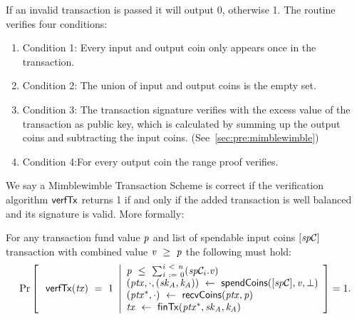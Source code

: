 \begin{definition}
\begin{itemize}
        If an invalid transaction is passed it will output 0, otherwise 1.
        The routine verifies four conditions:
        \begin{enumerate}
            \item Condition 1: Every input and output coin only appears once in the transaction.
            \item Condition 2: The union of input and output coins is the empty set.
            \item Condition 3: The transaction signature verifies with the excess value of the transaction as public key, which is calculated by summing up the output coins and subtracting the input coins. (See~\ref{sec:pre:mimblewimble})
            \item Condition 4:For every output coin the range proof verifies.
        \end{enumerate}
    \end{itemize}
\end{definition}

We say a Mimblewimble Transaction Scheme is correct if the verification algorithm $\mathsf{verfTx}$ returns 1 if and only if the added transaction is well balanced and its signature is valid.
More formally:
\begin{definition}
    \label{def:atom:tx-scheme-correctness}
    For any transaction fund value $\mathit{p}$ and list of spendable input coins $[\mathit{sp}\mathcal{C}]$ transaction with combined value $\mathit{v} ~\geq~ \mathit{p}$ the following must hold:
    \[
        \Pr\left[
        \begin{array}{c}
            \: \mathsf{verfTx}(\mathit{tx}) ~=~ 1
        \end{array}
        \middle\vert
        \begin{array}{l}
            \mathit{p} ~\leq~ \sum_{\mathit{i} ~:=~ 0}^{\mathit{i} ~<~ \mathit{n}}(\mathit{sp}\mathcal{C}_{i}.\mathit{v}) \\
            (\mathit{ptx}, \cdot, (\mathit{sk}_{\mathit{A}}, \mathit{\mathit{k}_{\mathit{A}}})) ~\leftarrow~ \mathsf{spendCoins}([\mathit{sp}\mathcal{C}],\mathit{v},\bot) \\
            (\mathit{ptx}^*, \cdot) ~\leftarrow~ \mathsf{recvCoins}(\mathit{ptx},\mathit{p}) \\
            \mathit{tx} ~\leftarrow~ \mathsf{finTx}(\mathit{ptx}^*,\mathit{sk}_{\mathit{A}},\mathit{\mathit{k}_{\mathit{A}}})
        \end{array}
        \right]=1.
    \]
\end{definition}

